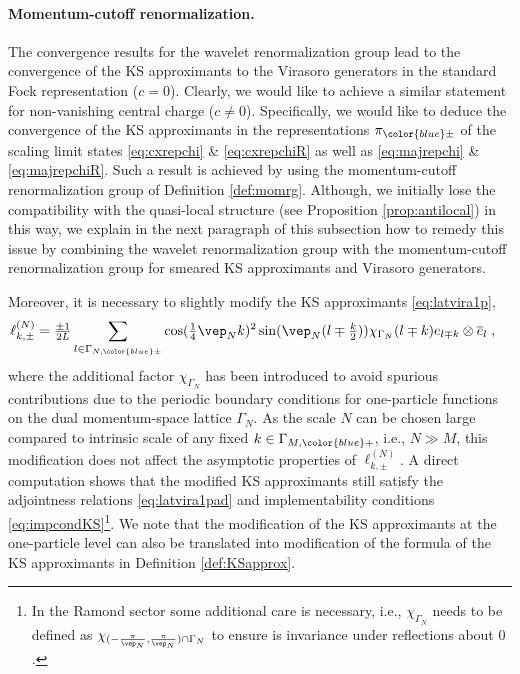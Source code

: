 \documentclass[a4paper, 11pt]{article}
\DeclareMathOperator{\1}{\mathds{1}}
\begin{document}
\paragraph{Momentum-cutoff renormalization.}
\label{sec:momconv}
The convergence results for the wavelet renormalization group lead to the convergence of the KS approximants to the Virasoro generators in the standard Fock representation ($c=0$). Clearly, we would like to achieve a similar statement for non-vanishing central charge ($c\neq 0$). Specifically, we would like to deduce the convergence of the KS approximants in the representations $\pi_{{\color{blue}\pm}}$ of the scaling limit states \eqref{eq:cxrepchi} \& \eqref{eq:cxrepchiR} as well as \eqref{eq:majrepchi} \& \eqref{eq:majrepchiR}. Such a result is achieved by using the momentum-cutoff renormalization group of Definition \ref{def:momrg}. Although, we initially lose the compatibility with the quasi-local structure (see Proposition \ref{prop:antilocal}) in this way, we explain in the next paragraph of this subsection how to remedy this issue by combining the wavelet renormalization group with the momentum-cutoff renormalization group for smeared KS approximants and Virasoro generators.

Moreover, it is necessary to slightly modify the KS approximants \eqref{eq:latvira1p},
\begin{align}
\label{eq:latvirachi1pmommod}
\ell^{(N)}_{k,\pm} & = \tfrac{\pm1}{2L}\sum_{l\in\Gamma_{N,{\color{blue}\pm}}} \cos(\tfrac{1}{4}\vep_{N}k)^{2}\sin(\vep_{N}(l\mp\tfrac{k}{2}))\chi_{\Gamma_{N}}(l\mp k)e_{l\mp k}\otimes \overline{e}_{l}\;,
\end{align}
where the additional factor $\chi_{\Gamma_{N}}$ has been introduced to avoid spurious contributions due to the periodic boundary conditions for one-particle functions on the dual momentum-space lattice $\Gamma_{N}$. As the scale $N$ can be chosen large compared to intrinsic scale of any fixed $k\in\Gamma_{M,{\color{blue}+}}$, i.e., $N\gg M$, this modification does not affect the asymptotic properties of $\ell^{(N)}_{k,\pm}$. A direct computation shows that the modified KS approximants still satisfy the adjointness relations \eqref{eq:latvira1pad} and implementability conditions \eqref{eq:impcondKS}\footnote{In the Ramond sector some additional care is necessary, i.e., $\chi_{\Gamma_{N}}$ needs to be defined as $\chi_{(-\frac{\pi}{\vep_{N}},\frac{\pi}{\vep_{N}})\cap \Gamma_{N}}$ to ensure is invariance under reflections about $0$.}. We note that the modification of the KS approximants at the one-particle level can also be translated into modification of the formula of the KS approximants in Definition \ref{def:KSapprox}.
\end{document}
